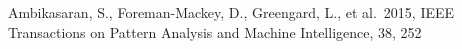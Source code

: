 \documentclass[twocolumn, twocolappendix]{aastex63}
\begin{document}
\clearpage




\begin{thebibliography}{}


















 Ambikasaran, S., Foreman-Mackey, D., Greengard, L., et al.\ 2015, IEEE Transactions on Pattern Analysis and Machine Intelligence, 38, 252











\end{thebibliography}
\end{document}
